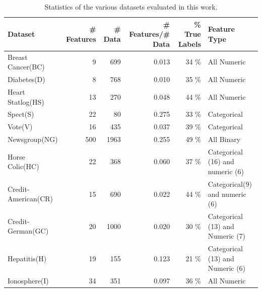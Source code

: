 \begin{table}[tbp!]
\centering
\begin{tabular}{|l|r|r|r|r|l|} \hline
Dataset & \# Features & \# Data & \# Features/\# Data & \% True Labels & Feature Type\\ \hline \hline 
Breast Cancer(BC)	& 9	& 699	& 0.013	& 34 \%	& All Numeric\\ \hline
Diabetes(D)        & 8	& 768	& 0.010	& 35 \%	& All Numeric\\ \hline
Heart Statlog(HS)	& 13	& 270	& 0.048	& 44 \%	& All Numeric\\ \hline
Spect(S)	        & 22	& 80	& 0.275 & 33 \%	& Categorical\\ \hline
Vote(V)	        & 16	& 435	& 0.037	& 39 \%	& Categorical\\ \hline
Newsgroup(NG)	& 500	& 1963	& 0.255	& 49 \%	& All Binary\\ \hline
Horse Colic(HC)	& 22	& 368	& 0.060	& 37 \%	& Categorical (16) and numeric (6)\\ \hline
Credit-American(CR)	& 15	& 690	& 0.022	& 44 \%	& Categorical(9) and numeric (6)\\ \hline
Credit-German(GC)	& 20	& 1000	& 0.020 & 30 \%	& Categorical (13) and Numeric (7)\\ \hline
Hepatitis(H)	& 19	& 155	& 0.123	& 21 \%	& Categorical (13) and Numeric (6)\\ \hline
Ionosphere(I)	& 34	& 351	& 0.097	& 36 \%	& All Numeric\\ \hline
\end{tabular}
\caption{\footnotesize Statistics of the various datasets evaluated in this work.}
\label{table:stats}
\end{table}

